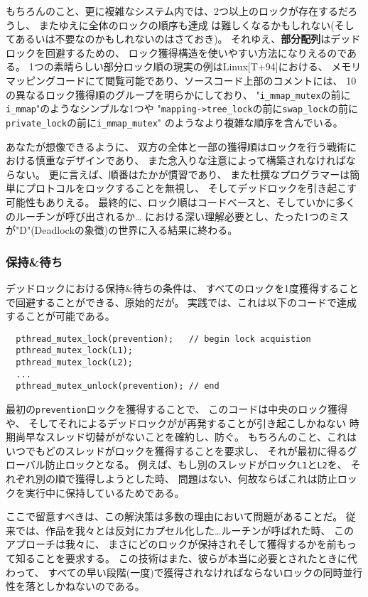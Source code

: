 \documentclass[11pt,a4paper, uplatex]{jsarticle}
\begin{document}
もちろんのこと、更に複雑なシステム内では、2つ以上のロックが存在するだろうし、
またゆえに全体のロックの順序も達成
は難しくなるかもしれない(そしてあるいは不要なのかもしれないのはさておき)。
それゆえ、\textbf{部分配列}はデッドロックを回避するための、
ロック獲得構造を使いやすい方法になりえるのである。
1つの素晴らしい部分ロック順の現実の例はLinux[T+94]における、
メモリマッピングコードにて閲覧可能であり、ソースコード上部のコメントには、
10の異なるロック獲得順のグループを明らかにしており、
"\texttt{i_mmap_mutex}の前に\texttt{i_mmap}"のようなシンプルな1つや
"\texttt{mapping-\textgreater tree_lock}の前に\texttt{swap_lock}の前に
\texttt{private_lock}の前に\texttt{i_mmap_mutex}"
のようなより複雑な順序を含んでいる。

あなたが想像できるように、
双方の全体と一部の獲得順はロックを行う戦術における慎重なデザインであり、
また念入りな注意によって構築されなければならない。
更に言えば、順番はたかが慣習であり、
また杜撰なプログラマーは簡単にプロトコルをロックすることを無視し、
そしてデッドロックを引き起こす可能性もありえる。
最終的に、ロック順はコードベースと、そしていかに多くのルーチンが呼び出されるか…
における深い理解必要とし、たった1つのミスが"D"(Deadlockの象徴)の世界に入る結果に終わる。

\subsubsection{保持\&待ち}
デッドロックにおける保持\&待ちの条件は、
すべてのロックを1度獲得することで回避することができる、原始的だが。
実践では、これは以下のコードで達成することが可能である。
\begin{lstlisting}
  pthread_mutex_lock(prevention);   // begin lock acquistion
  pthread_mutex_lock(L1);
  pthread_mutex_lock(L2);
  ...
  pthread_mutex_unlock(prevention); // end
\end{lstlisting}

最初の\texttt{prevention}ロックを獲得することで、
このコードは中央のロック獲得や、
そしてそれによるデッドロックがが再発することが引き起こしかねない
時期尚早なスレッド切替ががないことを確約し、防ぐ。
もちろんのこと、これはいつでもどのスレッドがロックを獲得することを要求し、
それが最初に得るグローバル防止ロックとなる。
例えば、もし別のスレッドがロック\texttt{L1}と\texttt{L2}を、
それぞれ別の順で獲得しようとした時、
問題はない、何故ならばこれは防止ロックを実行中に保持しているためである。

ここで留意すべきは、この解決策は多数の理由において問題があることだ。
従来では、作品を我々とは反対にカプセル化した…ルーチンが呼ばれた時、
このアプローチは我々に、
まさにどのロックが保持されそして獲得するかを前もって知ることを要求する。
この技術はまた、彼らが本当に必要とされたときに代わって、
すべての早い段階(一度)で獲得されなければならないロックの同時並行性を落としかねないのである。
\end{document}
